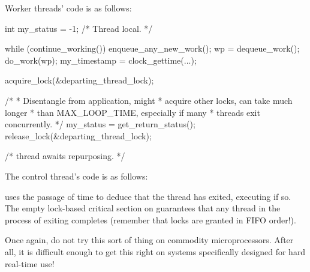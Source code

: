 {{	Worker threads' code is as follows:

\begin{VerbatimN}
	int my_status = -1;  /* Thread local. */

	while (continue_working()) {
		enqueue_any_new_work();
		wp = dequeue_work();
		do_work(wp);
		my_timestamp = clock_gettime(...);
	}

	acquire_lock(&departing_thread_lock);

	/*
	 * Disentangle from application, might
	 * acquire other locks, can take much longer
	 * than MAX_LOOP_TIME, especially if many
	 * threads exit concurrently.
	 */
	my_status = get_return_status();
	release_lock(&departing_thread_lock);

	/* thread awaits repurposing. */
\end{VerbatimN}

	The control thread's code is as follows:

\begin{fcvlabel}
\end{fcvlabel}

	\begin{fcvref}
	 uses the passage of time to deduce that the thread
	has exited, executing  if so.
	The empty lock-based critical section on 
	guarantees that any thread in the process of exiting
	completes (remember that locks are granted in FIFO order!).
	\end{fcvref}

	Once again, do not try this sort of thing on commodity
	microprocessors.
	After all, it is difficult enough to get this right on systems
	specifically designed for hard real-time use!
}\QuickQuizEndE
}

